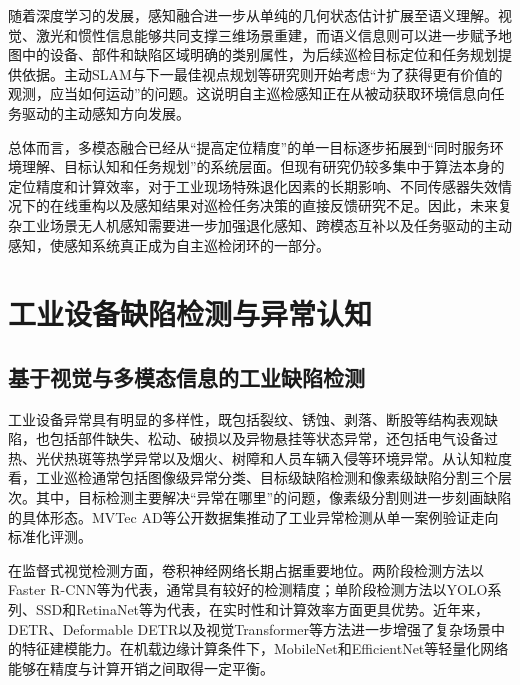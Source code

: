 随着深度学习的发展，感知融合进一步从单纯的几何状态估计扩展至语义理解。视觉、激光和惯性信息能够共同支撑三维场景重建，而语义信息则可以进一步赋予地图中的设备、部件和缺陷区域明确的类别属性，为后续巡检目标定位和任务规划提供依据\cite{huangzx2023survey,tao2019digital}。主动SLAM与下一最佳视点规划等研究则开始考虑“为了获得更有价值的观测，应当如何运动”的问题\cite{placed2023active,bircher2016receding}。这说明自主巡检感知正在从被动获取环境信息向任务驱动的主动感知方向发展。

总体而言，多模态融合已经从“提高定位精度”的单一目标逐步拓展到“同时服务环境理解、目标认知和任务规划”的系统层面。但现有研究仍较多集中于算法本身的定位精度和计算效率，对于工业现场特殊退化因素的长期影响、不同传感器失效情况下的在线重构以及感知结果对巡检任务决策的直接反馈研究不足。因此，未来复杂工业场景无人机感知需要进一步加强退化感知、跨模态互补以及任务驱动的主动感知，使感知系统真正成为自主巡检闭环的一部分。

\section{工业设备缺陷检测与异常认知}

\subsection{基于视觉与多模态信息的工业缺陷检测}

工业设备异常具有明显的多样性，既包括裂纹、锈蚀、剥落、断股等结构表观缺陷，也包括部件缺失、松动、破损以及异物悬挂等状态异常，还包括电气设备过热、光伏热斑等热学异常以及烟火、树障和人员车辆入侵等环境异常\cite{taox2021survey,nguyen2018automatic,miao2020uav}。从认知粒度看，工业巡检通常包括图像级异常分类、目标级缺陷检测和像素级缺陷分割三个层次\cite{taox2021survey}。其中，目标检测主要解决“异常在哪里”的问题，像素级分割则进一步刻画缺陷的具体形态。MVTec AD等公开数据集推动了工业异常检测从单一案例验证走向标准化评测\cite{bergmann2019mvtec}。

在监督式视觉检测方面，卷积神经网络长期占据重要地位。两阶段检测方法以Faster R-CNN\cite{ren2015faster}等为代表，通常具有较好的检测精度；单阶段检测方法以YOLO系列、SSD和RetinaNet等为代表，在实时性和计算效率方面更具优势\cite{redmon2016you,redmon2017yolo9000,redmon2018yolov3,bochkovskiy2020yolov4,wang2023yolov7,liu2016ssd,lin2017focal}。近年来，DETR、Deformable DETR以及视觉Transformer等方法进一步增强了复杂场景中的特征建模能力\cite{carion2020end,zhu2021deformable,dosovitskiy2021image,liu2021swin,vaswani2017attention}。在机载边缘计算条件下，MobileNet和EfficientNet等轻量化网络能够在精度与计算开销之间取得一定平衡\cite{howard2017mobilenets,tan2019efficientnet}。

